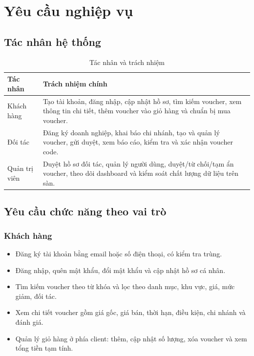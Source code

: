 \chapter{Yêu cầu nghiệp vụ}

\section{Tác nhân hệ thống}

\begin{table}[H]
\centering
\begin{tabularx}{\textwidth}{|p{3.4cm}|Y|}
\hline
\textbf{Tác nhân} & \textbf{Trách nhiệm chính} \\ \hline
Khách hàng & Tạo tài khoản, đăng nhập, cập nhật hồ sơ, tìm kiếm voucher, xem thông tin chi tiết, thêm voucher vào giỏ hàng và chuẩn bị mua voucher. \\ \hline
Đối tác & Đăng ký doanh nghiệp, khai báo chi nhánh, tạo và quản lý voucher, gửi duyệt, xem báo cáo, kiểm tra và xác nhận voucher code. \\ \hline
Quản trị viên & Duyệt hồ sơ đối tác, quản lý người dùng, duyệt/từ chối/tạm ẩn voucher, theo dõi dashboard và kiểm soát chất lượng dữ liệu trên sàn. \\ \hline
\end{tabularx}
\caption{Tác nhân và trách nhiệm}
\end{table}

\section{Yêu cầu chức năng theo vai trò}

\subsection{Khách hàng}

\begin{itemize}[leftmargin=1.2cm]
    \item Đăng ký tài khoản bằng email hoặc số điện thoại, có kiểm tra trùng.
    \item Đăng nhập, quên mật khẩu, đổi mật khẩu và cập nhật hồ sơ cá nhân.
    \item Tìm kiếm voucher theo từ khóa và lọc theo danh mục, khu vực, giá, mức giảm, đối tác.
    \item Xem chi tiết voucher gồm giá gốc, giá bán, thời hạn, điều kiện, chi nhánh và đánh giá.
    \item Quản lý giỏ hàng ở phía client: thêm, cập nhật số lượng, xóa voucher và xem tổng tiền tạm tính.
\end{itemize}

